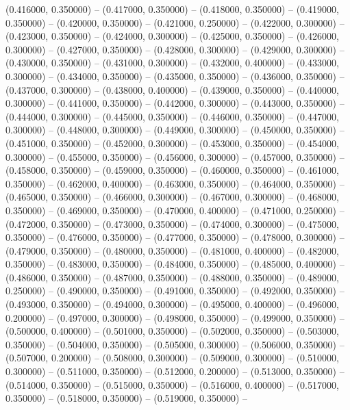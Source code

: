 (0.416000, 0.350000) -- 
(0.417000, 0.350000) -- 
(0.418000, 0.350000) -- 
(0.419000, 0.350000) -- 
(0.420000, 0.350000) -- 
(0.421000, 0.250000) -- 
(0.422000, 0.300000) -- 
(0.423000, 0.350000) -- 
(0.424000, 0.300000) -- 
(0.425000, 0.350000) -- 
(0.426000, 0.300000) -- 
(0.427000, 0.350000) -- 
(0.428000, 0.300000) -- 
(0.429000, 0.300000) -- 
(0.430000, 0.350000) -- 
(0.431000, 0.300000) -- 
(0.432000, 0.400000) -- 
(0.433000, 0.300000) -- 
(0.434000, 0.350000) -- 
(0.435000, 0.350000) -- 
(0.436000, 0.350000) -- 
(0.437000, 0.300000) -- 
(0.438000, 0.400000) -- 
(0.439000, 0.350000) -- 
(0.440000, 0.300000) -- 
(0.441000, 0.350000) -- 
(0.442000, 0.300000) -- 
(0.443000, 0.350000) -- 
(0.444000, 0.300000) -- 
(0.445000, 0.350000) -- 
(0.446000, 0.350000) -- 
(0.447000, 0.300000) -- 
(0.448000, 0.300000) -- 
(0.449000, 0.300000) -- 
(0.450000, 0.350000) -- 
(0.451000, 0.350000) -- 
(0.452000, 0.300000) -- 
(0.453000, 0.350000) -- 
(0.454000, 0.300000) -- 
(0.455000, 0.350000) -- 
(0.456000, 0.300000) -- 
(0.457000, 0.350000) -- 
(0.458000, 0.350000) -- 
(0.459000, 0.350000) -- 
(0.460000, 0.350000) -- 
(0.461000, 0.350000) -- 
(0.462000, 0.400000) -- 
(0.463000, 0.350000) -- 
(0.464000, 0.350000) -- 
(0.465000, 0.350000) -- 
(0.466000, 0.300000) -- 
(0.467000, 0.300000) -- 
(0.468000, 0.350000) -- 
(0.469000, 0.350000) -- 
(0.470000, 0.400000) -- 
(0.471000, 0.250000) -- 
(0.472000, 0.350000) -- 
(0.473000, 0.350000) -- 
(0.474000, 0.300000) -- 
(0.475000, 0.350000) -- 
(0.476000, 0.350000) -- 
(0.477000, 0.350000) -- 
(0.478000, 0.300000) -- 
(0.479000, 0.350000) -- 
(0.480000, 0.350000) -- 
(0.481000, 0.400000) -- 
(0.482000, 0.350000) -- 
(0.483000, 0.350000) -- 
(0.484000, 0.350000) -- 
(0.485000, 0.400000) -- 
(0.486000, 0.350000) -- 
(0.487000, 0.350000) -- 
(0.488000, 0.350000) -- 
(0.489000, 0.250000) -- 
(0.490000, 0.350000) -- 
(0.491000, 0.350000) -- 
(0.492000, 0.350000) -- 
(0.493000, 0.350000) -- 
(0.494000, 0.300000) -- 
(0.495000, 0.400000) -- 
(0.496000, 0.200000) -- 
(0.497000, 0.300000) -- 
(0.498000, 0.350000) -- 
(0.499000, 0.350000) -- 
(0.500000, 0.400000) -- 
(0.501000, 0.350000) -- 
(0.502000, 0.350000) -- 
(0.503000, 0.350000) -- 
(0.504000, 0.350000) -- 
(0.505000, 0.300000) -- 
(0.506000, 0.350000) -- 
(0.507000, 0.200000) -- 
(0.508000, 0.300000) -- 
(0.509000, 0.300000) -- 
(0.510000, 0.300000) -- 
(0.511000, 0.350000) -- 
(0.512000, 0.200000) -- 
(0.513000, 0.350000) -- 
(0.514000, 0.350000) -- 
(0.515000, 0.350000) -- 
(0.516000, 0.400000) -- 
(0.517000, 0.350000) -- 
(0.518000, 0.350000) -- 
(0.519000, 0.350000) -- 
